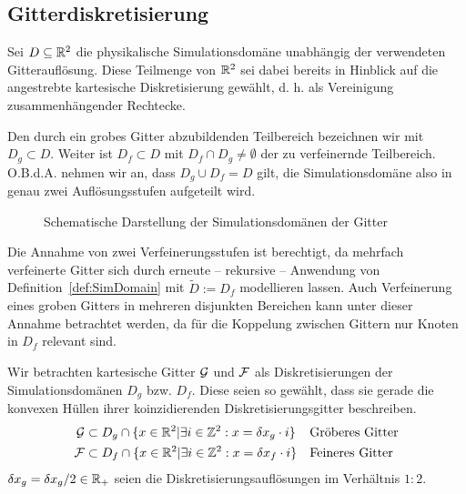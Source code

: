 \newpage
\subsection{Gitterdiskretisierung}

\begin{Definition}
\label{def:SimDomain}
Sei \(D \subseteq \mathbb{R}^2\) die physikalische Simulationsdomäne unabhängig der verwendeten Gitterauflösung. Diese Teilmenge von \(\mathbb{R}^2\) sei dabei bereits in Hinblick auf die angestrebte kartesische Diskretisierung gewählt, d. h. als Vereinigung zusammenhängender Rechtecke.

Den durch ein grobes Gitter abzubildenden Teilbereich bezeichnen wir mit \(D_g \subset D\). Weiter ist \(D_f \subset D\) mit \(D_f \cap D_g \neq \emptyset\) der zu verfeinernde Teilbereich. O.B.d.A. nehmen wir an, dass \(D_g \cup D_f = D\) gilt, die Simulationsdomäne also in genau zwei Auflösungsstufen aufgeteilt wird.
\end{Definition}

\begin{figure}[h]
\centering

\caption{Schematische Darstellung der Simulationsdomänen der Gitter}
\label{fig:SimDomain}
\end{figure}

Die Annahme von zwei Verfeinerungsstufen ist berechtigt, da mehrfach verfeinerte Gitter sich durch erneute -- rekursive -- Anwendung von Definition~\ref{def:SimDomain} mit \(\tilde{D} := D_f\) modellieren lassen. Auch Verfeinerung eines groben Gitters in mehreren disjunkten Bereichen kann unter dieser Annahme betrachtet werden, da für die Koppelung zwischen Gittern nur Knoten in \(D_f\) relevant sind.

\begin{Definition}
\label{def:DiskretRefinedGitter}
Wir betrachten kartesische Gitter \(\mathcal{G}\) und \(\mathcal{F}\) als Diskretisierungen der Simulationsdomänen \(D_g\) bzw. \(D_f\). Diese seien so gewählt, dass sie gerade die konvexen Hüllen ihrer koinzidierenden Diskretisierungsgitter beschreiben.
\begin{align*}
\mathcal{G} &\subset D_g \cap \{ x \in \mathbb{R}^2 | \exists i \in \mathbb{Z}^2 : x = \delta x_g \cdot i \} && \text{Gröberes Gitter} \\
\mathcal{F} &\subset D_f \cap \{ x \in \mathbb{R}^2 | \exists i \in \mathbb{Z}^2 : x = \delta x_f \cdot i \} && \text{Feineres Gitter}
\end{align*}
\(\delta x_g = \delta x_g / 2 \in \mathbb{R}_+\) seien die Diskretisierungsauflösungen im Verhältnis \(1:2\).
\end{Definition}

